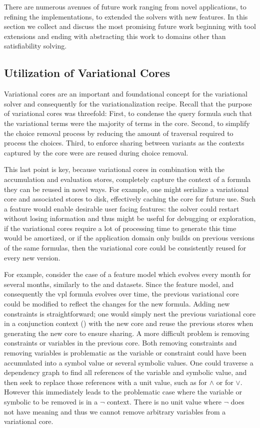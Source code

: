 \label{section:conclusion:future-work}

There are numerous avenues of future work ranging from novel applications, to
refining the implementations, to extended the solvers with new features. In this
section we collect and discuss the most promising future work beginning with
tool extensions and ending with abstracting this work to domains other than
satisfiability solving.

\subsection{Utilization of Variational Cores}
Variational cores are an important and foundational concept for the variational
solver and consequently for the variationalization recipe. Recall that the
purpose of variational cores was threefold: First, to condense the query formula
such that the variational terms were the majority of terms in the core. Second,
to simplify the choice removal process by reducing the amount of traversal
required to process the choices. Third, to enforce sharing between variants as
the contexts captured by the core were are reused during choice removal.

This last point is key, because variational cores in combination with the
accumulation and evaluation stores, completely capture the context of a formula
they can be reused in novel ways. For example, one might serialize a variational
core and associated stores to disk, effectively caching the core for future use.
Such a feature would enable desirable user facing features: the solver could
restart without losing information and thus might be useful for debugging or
exploration, if the variational cores require a lot of processing time to
generate this time would be amortized, or if the application domain only builds
on previous versions of the same formulas, then the variational core could be
consistently reused for every new version.

For example, consider the case of a feature model which evolves every month for
several months, similarly to the \fin{} and \auto{} datasets. Since the feature
model, and consequently the \ac{vpl} formula evolves over time, the previous
variational core could be modified to reflect the changes for the new formula.
Adding new constraints is straightforward; one would simply nest the previous
variational core in a conjunction context () with
the new core and reuse the previous stores when generating the new core to
ensure sharing. A more difficult problem is removing constraints or variables in
the previous core. Both removing constraints and removing variables is
problematic as the variable or constraint could have been accumulated into a
symbol value or several symbolic values. One could traverse a dependency graph
to find all references of the variable and symbolic value, and then seek to
replace those references with a unit value, such as \tru{} for $\wedge$ or
\fls{} for $\vee$. However this immediately leads to the problematic case where
the variable or symbolic to be removed is in a $\neg$ context. There is no unit
value where $\neg$ does not have meaning and thus we cannot remove arbitrary
variables from a variational core.

